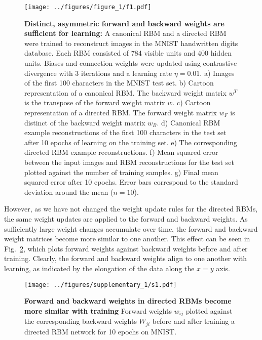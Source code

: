 \documentclass[11pt]{article}
\begin{document}
\begin{figure}[H]
  \label{fig:directed_rbm}
  \centering
  \texttt{[image: ../figures/figure\_1/f1.pdf]}
  \caption{\footnotesize
    \textbf{Distinct, asymmetric forward and backward weights are sufficient for learning:}
    A canonical RBM and a directed RBM were trained to reconstruct
    images in the MNIST handwritten digits database.
    Each RBM consisted of 784 visible units and 400 hidden units.
    Biases and connection weights were updated using contrastive
    divergence with 3 iterations and a learning rate $\eta=0.01$.
    a) Images of the first 100 characters in the MNIST test set.
    b) Cartoon representation of a canonical RBM. The backward weight
    matrix $w^T$ is the transpose of the forward weight matrix $w$.
    c) Cartoon representation of a directed RBM. The forward weight
    matrix $w_F$ is distinct of the backward weight matrix $w_B$.
    d) Canonical RBM example reconstructions of the first 100
    characters in the test set after 10 epochs of learning on the
    training set.
    e) The corresponding directed RBM example reconstructions.
    f) Mean squared error between the input images and RBM
    reconstructions for the test set plotted against the number of
    training samples.
    g) Final mean squared error after 10 epochs. Error bars correspond
    to the standard deviation around the mean ($n = 10$).
  }
\end{figure}

However, as we have not changed the weight update rules for the
directed RBMs, the same weight updates are applied to the forward and
backward weights. As sufficiently large weight changes accumulate over
time, the forward and backward weight matrices become more similar to
one another. This effect can be seen in
Fig.~\ref{fig:weight_alignment}, which plots forward weights against
backward weights before and after training. Clearly, the forward and
backward weights align to one another with learning, as indicated by
the elongation of the data along the $x=y$ axis.

\begin{figure}[H]
  \label{fig:weight_alignment}
  \centering
  \texttt{[image: ../figures/supplementary\_1/s1.pdf]}
  \caption{\textbf{Forward and backward weights in directed RBMs
      become more similar with training}
    Forward weights $w_{ij}$ plotted against the corresponding
    backward weights $W_{ji}$ before and after training a directed RBM
    network for 10 epochs on MNIST.
  }
\end{figure}
\end{document}
